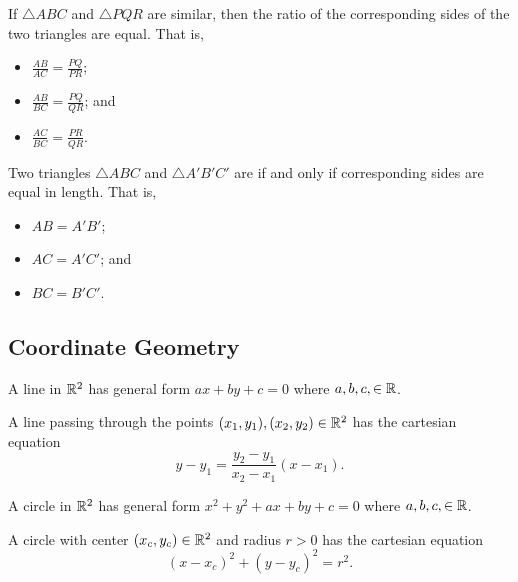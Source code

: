 \begin{proposition}
    If $\triangle ABC$ and $\triangle PQR$ are similar, then the ratio of the corresponding sides of the two triangles are equal. That is,
    \begin{itemize}
        \item $\frac{AB}{AC} = \frac{PQ}{PR}$;
        \item $\frac{AB}{BC} = \frac{PQ}{QR}$; and
        \item $\frac{AC}{BC} = \frac{PR}{QR}$.
    \end{itemize}
\end{proposition}

\begin{definition}
    Two triangles $\triangle ABC$ and $\triangle A'B'C'$ are  if and only if corresponding sides are equal in length. That is,
    \begin{itemize}
        \item $AB = A'B'$;
        \item $AC = A'C'$; and
        \item $BC = B'C'$.
    \end{itemize}
\end{definition}

\subsection{Coordinate Geometry}
\begin{definition}
    A line in $\mathbb{R}^2$ has general form $ax + by + c = 0$ where $a,b,c, \in \mathbb{R}$.
\end{definition}

\begin{proposition}
    A line passing through the points $(x_1, y_1), (x_2, y_2) \in \mathbb{R}^2$ has the cartesian equation
    \[
        y - y_1 = \frac{y_2-y_1}{x_2-x_1}(x - x_1).
    \]
\end{proposition}

\begin{definition}
    A circle in $\mathbb{R}^2$ has general form $x^2 + y^2 + ax + by + c = 0$ where $a,b,c, \in \mathbb{R}$.
\end{definition}

\begin{proposition}
    A circle with center $(x_c, y_c) \in \mathbb{R}^2$ and radius $r > 0$ has the cartesian equation
    \[
        (x-x_c)^2 + (y-y_c)^2 = r^2.
    \]
\end{proposition}

